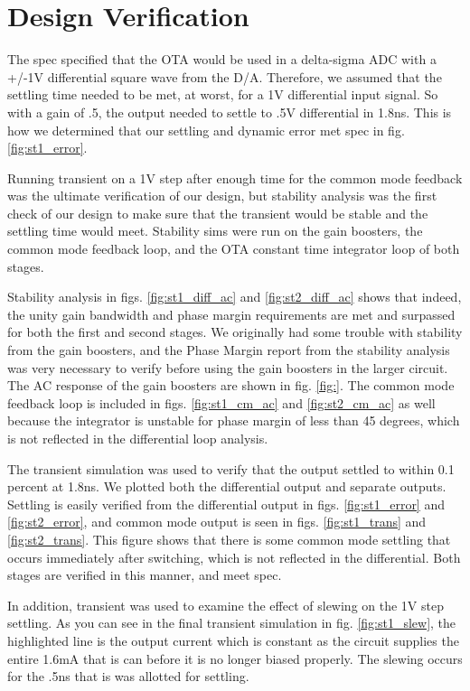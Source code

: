 \documentclass[conference]{IEEEtran}
\begin{document}
\section{Design Verification}

The spec specified that the OTA would be used in a delta-sigma ADC with a +/-1V differential square wave from the D/A. Therefore, we assumed that the settling time needed to be met, at worst, for a 1V differential input signal. So with a gain of .5, the output needed to settle to .5V differential in 1.8ns. This is how we determined that our settling and dynamic error met spec in fig. \ref{fig:st1_error}.

Running transient on a 1V step after enough time for the common mode feedback was the ultimate verification of our design, but stability analysis was the first check of our design to make sure that the transient would be stable and the settling time would meet. Stability sims were run on the gain boosters, the common mode feedback loop, and the OTA constant time integrator loop of both stages.

Stability analysis in figs. \ref{fig:st1_diff_ac} and \ref{fig:st2_diff_ac} shows that indeed, the unity gain bandwidth and phase margin requirements are met and surpassed for both the first and second stages. We originally had some trouble with stability from the gain boosters, and the Phase Margin report from the stability analysis was very necessary to verify before using the gain boosters in the larger circuit. The AC response of the gain boosters are shown in fig. \ref{fig:}. The common mode feedback loop is included in figs. \ref{fig:st1_cm_ac} and \ref{fig:st2_cm_ac} as well because the integrator is unstable for phase margin of less than 45 degrees, which is not reflected in the differential loop analysis.



The transient simulation was used to verify that the output settled to within 0.1 percent at 1.8ns. We plotted both the differential output and separate outputs. Settling is easily verified from the differential output in figs. \ref{fig:st1_error} and \ref{fig:st2_error}, and common mode output is seen in figs. \ref{fig:st1_trans} and \ref{fig:st2_trans}. This figure shows that there is some common mode settling that occurs immediately after switching, which is not reflected in the differential. Both stages are verified in this manner, and meet spec.

In addition, transient was used to examine the effect of slewing on the 1V step settling. As you can see in the final transient simulation in fig. \ref{fig:st1_slew}, the highlighted line is the output current which is constant as the circuit supplies the entire 1.6mA that is can before it is no longer biased properly. The slewing occurs for the .5ns that is was allotted for settling.
\end{document}
